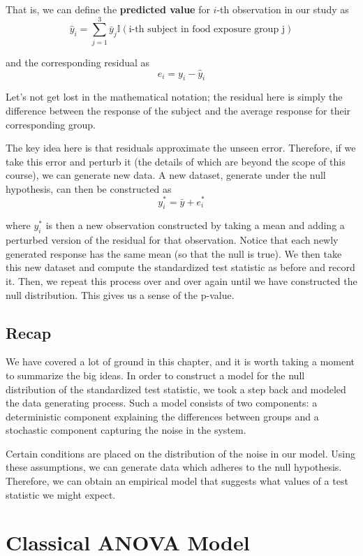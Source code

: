 \documentclass[]{book}
\theoremstyle{definition}
\theoremstyle{definition}
\theoremstyle{definition}
\theoremstyle{remark}
\begin{document}
That is, we can define the \textbf{predicted value} for \(i\)-th
observation in our study as \[
\widehat{y}_i = \sum_{j=1}^{3} \bar{y}_j \mathbb{I}(\text{i-th subject in food exposure group j})
\]

and the corresponding residual as \[
e_i = y_i - \widehat{y}_i
\]

Let's not get lost in the mathematical notation; the residual here is
simply the difference between the response of the subject and the
average response for their corresponding group.

The key idea here is that residuals approximate the unseen error.
Therefore, if we take this error and perturb it (the details of which
are beyond the scope of this course), we can generate new data. A new
dataset, generate under the null hypothesis, can then be constructed as
\[
y_i^* = \bar{y} + e_i^*
\]

where \(y_i^*\) is then a new observation constructed by taking a mean
and adding a perturbed version of the residual for that observation.
Notice that each newly generated response has the same mean (so that the
null is true). We then take this new dataset and compute the
standardized test statistic as before and record it. Then, we repeat
this process over and over again until we have constructed the null
distribution. This gives us a sense of the p-value.

\section{Recap}\label{recap}

We have covered a lot of ground in this chapter, and it is worth taking
a moment to summarize the big ideas. In order to construct a model for
the null distribution of the standardized test statistic, we took a step
back and modeled the data generating process. Such a model consists of
two components: a deterministic component explaining the differences
between groups and a stochastic component capturing the noise in the
system.

Certain conditions are placed on the distribution of the noise in our
model. Using these assumptions, we can generate data which adheres to
the null hypothesis. Therefore, we can obtain an empirical model that
suggests what values of a test statistic we might expect.

\chapter{Classical ANOVA Model}\label{ANOVAclassical}
\end{document}
